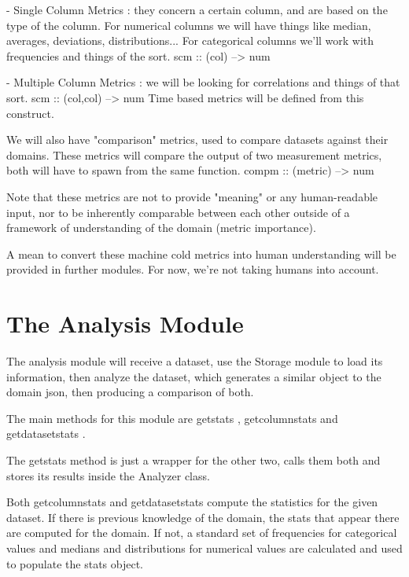   - Single Column Metrics : they concern a certain column, and are based on the type of the column.
    For numerical columns we will have things like median, averages, deviations, distributions...
    For categorical columns we'll work with frequencies and things of the sort.
    scm :: (col) --> num
    
  - Multiple Column Metrics : we will be looking for correlations and things of that sort.
    scm :: (col,col) --> num 
    Time based metrics will be defined from this construct.

We will also have "comparison" metrics, used to compare datasets against their domains.
These metrics will compare the output of two measurement metrics, both will have to
spawn from the same function.
  compm :: (metric) --> num

Note that these metrics are not to provide "meaning" or any human-readable input, nor to be
inherently comparable between each other outside of a framework of understanding of the domain
(metric importance).

A mean to convert these machine cold metrics into human understanding will be provided in further 
modules. For now, we're not taking humans into account.

\section{The Analysis Module}
\label{cap2:sec:analysis}

The analysis module will receive a dataset, use the Storage module to load its information, then analyze the dataset, which generates a similar object to the domain json, then producing a comparison of both.

The main methods for this module are  getstats ,  getcolumnstats  and  getdatasetstats .

The  getstats  method is just a wrapper for the other two, calls them both and stores its results inside the Analyzer class.

Both  getcolumnstats  and  getdatasetstats  compute the statistics for the given dataset. If there is previous knowledge of the domain, the stats that appear there are computed for the domain. If not, a standard set of frequencies for categorical values and medians and distributions for numerical values are calculated and used to populate the stats object.

